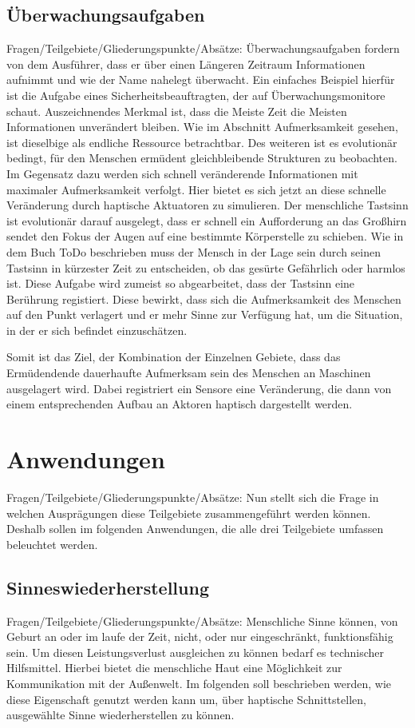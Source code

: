 \documentclass{llncs}					%
\begin{document}
\newpage
\subsection{Überwachungsaufgaben}
Fragen/Teilgebiete/Gliederungspunkte/Absätze:
Überwachungsaufgaben fordern von dem Ausführer, dass er über einen Längeren Zeitraum Informationen aufnimmt und wie der Name nahelegt überwacht. Ein einfaches Beispiel hierfür ist die Aufgabe eines Sicherheitsbeauftragten, der auf Überwachungsmonitore schaut. Auszeichnendes Merkmal ist, dass die Meiste Zeit die Meisten Informationen unverändert bleiben. Wie im Abschnitt Aufmerksamkeit gesehen, ist dieselbige als endliche Ressource betrachtbar. Des weiteren ist es evolutionär bedingt, für den Menschen ermüdent gleichbleibende Strukturen zu beobachten. Im Gegensatz dazu werden sich schnell veränderende Informationen mit maximaler Aufmerksamkeit verfolgt. Hier bietet es sich jetzt an diese schnelle Veränderung durch haptische Aktuatoren zu simulieren.
Der menschliche Tastsinn ist evolutionär darauf ausgelegt, dass er schnell ein Aufforderung an das Großhirn sendet den Fokus der Augen auf eine bestimmte Körperstelle zu schieben. Wie in dem Buch ToDo beschrieben muss der Mensch in der Lage sein durch seinen Tastsinn in kürzester Zeit zu entscheiden, ob das gesürte Gefährlich oder harmlos ist. Diese Aufgabe wird zumeist so abgearbeitet, dass der Tastsinn eine Berührung registiert. Diese bewirkt, dass sich die Aufmerksamkeit des Menschen auf den Punkt verlagert und er mehr Sinne zur Verfügung hat, um die Situation, in der er sich befindet einzuschätzen.

Somit ist das Ziel, der Kombination der Einzelnen Gebiete, dass das Ermüdendende dauerhaufte Aufmerksam sein des Menschen an Maschinen ausgelagert wird. Dabei registriert ein Sensore eine Veränderung, die dann von einem entsprechenden Aufbau an Aktoren haptisch dargestellt werden.

\section{Anwendungen}
Fragen/Teilgebiete/Gliederungspunkte/Absätze:
Nun stellt sich die Frage in welchen Ausprägungen diese Teilgebiete zusammengeführt werden können. Deshalb sollen im folgenden Anwendungen, die alle drei Teilgebiete umfassen beleuchtet werden.
\subsection{Sinneswiederherstellung}
Fragen/Teilgebiete/Gliederungspunkte/Absätze:
Menschliche Sinne können, von Geburt an oder im laufe der Zeit, nicht, oder nur eingeschränkt, funktionsfähig sein. Um diesen Leistungsverlust ausgleichen zu können bedarf es technischer Hilfsmittel. Hierbei bietet die menschliche Haut eine Möglichkeit zur Kommunikation mit der Außenwelt. Im folgenden soll beschrieben werden, wie diese Eigenschaft genutzt werden kann um, über haptische Schnittstellen, ausgewählte Sinne wiederherstellen zu können.
\end{document}
